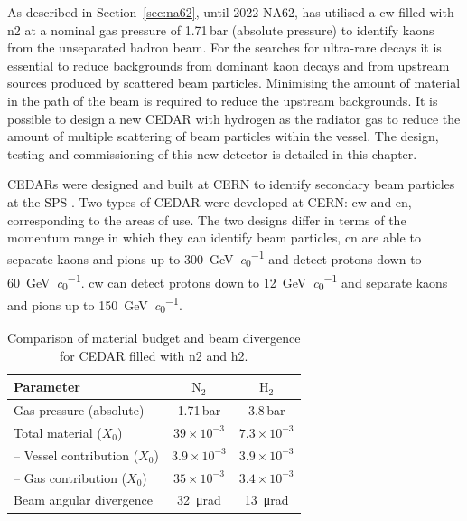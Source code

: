 \documentclass[../../main.tex]{subfiles}
\begin{document}
    \glsresetall

    As described in Section~\ref{sec:na62}, until 2022 NA62, has utilised a \gls{cw} filled with \gls{n2} at a nominal gas pressure of 1.71\,bar (absolute pressure) to identify kaons from the unseparated hadron beam.
    For the searches for ultra-rare decays it is essential to reduce backgrounds from dominant kaon decays and from upstream sources produced by scattered beam particles. Minimising the amount of material in the path of the beam is required to reduce the upstream backgrounds. 
    It is possible to design a new \gls{CEDAR} with hydrogen as the radiator gas to reduce the amount of multiple scattering of beam particles within the vessel. The design, testing and commissioning of this new detector is detailed in this chapter.

    

    \glspl{CEDAR} were designed and built at CERN to identify secondary beam particles at the \gls{SPS} \cite{Bovet:1982xf}. Two types of \gls{CEDAR} were developed at CERN:
    \gls{cw} and \gls{cn}, corresponding to the areas of use. The two designs differ in terms of the momentum range in which they can identify beam particles, \gls{cn} 
    are able to separate kaons and pions up to \SI{300}{\giga\electronvolt\per\clight} and detect protons down to \SI{60}{\giga\electronvolt\per\clight}. \gls{cw} can detect protons down to \SI{12}{\giga\electronvolt\per\clight}
    and separate kaons and pions up to \SI{150}{{\giga\electronvolt\per\clight}}. 
    \begin{table}[t]
        \centering
        \begin{tabular}{|l|c|c|}
        \hline
        \textbf{Parameter} & \textbf{$\text{N}_2$} & \textbf{$\text{H}_2$} \\ \hline
        Gas pressure (absolute) & 1.71\,bar & 3.8\,bar \\ \hline
        Total material ($X_0$) & $39 \times 10^{-3}$ & $7.3 \times 10^{-3}$ \\
        \quad -- Vessel contribution ($X_0$) & $3.9 \times 10^{-3}$ & $3.9 \times 10^{-3}$ \\
        \quad -- Gas contribution ($X_0$) & $35 \times 10^{-3}$ & $3.4 \times 10^{-3}$ \\ \hline
        Beam angular divergence & \SI{32}{\micro\radian}  & \SI{13}{\micro\radian} \\ \hline
        \end{tabular}
        \caption{Comparison of material budget and beam divergence for \gls{CEDAR} filled with \gls{n2} and \gls{h2}.}
        \label{tab:cedar_material_comparison}
    \end{table}
    
\end{document}
